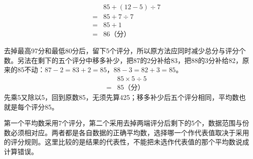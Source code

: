 \documentclass[multi=snippet,border=0pt]{standalone}
\newenvironment{snippet}[3]{\begin{minipage}{#1bp}\color{answerred}\fontsize{#2}{#3}\selectfont\raggedright}{\end{minipage}}
\begin{document}
\begin{snippet}{189}{9.0}{12.8}\[\begin{aligned}&85+(12-5)\div7\\={}&85+7\div7\\={}&85+1\\={}&86\text{（分）}\end{aligned}\]\end{snippet}
\begin{snippet}{505}{11.5}{14}去掉最高97分和最低80分后，留下5个评分，所以原方法应同时减少总分与评分个数。另法在剩下的五个评分中移多补少，把87的2分补给83，把88的3分补给82，原来的85不动：\(87-2=83+2=85\)，\(88-3=82+3=85\)。\[\begin{aligned}&85\times5\div5\\={}&85\text{（分）}\end{aligned}\]先乘5又除以5，回到原数85，无须先算425；移多补少后五个评分相同，平均数也就是每个评分85。\end{snippet}
\begin{snippet}{505}{11.5}{14}第一个平均数采用7个评分，第二个采用去掉两端评分后剩下的5个，数据范围与份数必须相对应。两者都是各自数据的正确平均数，选择哪一个作代表值取决于采用的评分规则。这里比较的是结果的代表性，不能把未选作代表值的那个平均数说成计算错误。\end{snippet}
\end{document}
